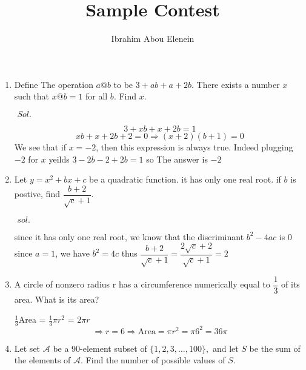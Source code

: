 \documentclass[a4paper]{article}
\theoremstyle{definition}
\begin{document}
\author{Ibrahim Abou Elenein}
\title{\textbf{Sample Contest}}
\maketitle
\noindent
\begin{enumerate}


\item Define The operation $a@b$ to be $3 + ab + a + 2b$. There exists a number
$x$ such that $x@b =1$ for all $b$. Find $x$.
\begin{tcolorbox}[width=\linewidth, sharp corners=all, colback=white!95!black]

$\textit{ Sol. }$

\[
    3 + xb + x + 2b = 1
\]
\[
    xb + x + 2b + 2 = 0 \Rightarrow (x+2)(b+1) = 0
\]
We see that if $x=-2$, then this expression is always true. Indeed
plugging $-2$ for $x$ yeilds $3-2b-2+2b=1$ so The answer is $-2$

\end{tcolorbox}

\item Let $y = x^2 + bx +c$ be a quadratic function. it has only one real root. if $b$
is postive, find $\dfrac{b+2}{\sqrt{c} + 1}$.

\begin{tcolorbox}[width=\linewidth, sharp corners=all, colback=white!95!black]

$\textit{ sol. }$

since it has only one real root, we know that the discriminant $b^2-4ac$ is $0$
since $a=1$, we have $b^2 = 4c$ thus $\dfrac{b+2}{\sqrt{c} + 1} = \dfrac{2\sqrt{c} + 2}{\sqrt{c} + 1} = 2$
\end{tcolorbox}


\item A circle of nonzero radius r has a circumference numerically equal to
$\dfrac{1}{3}$ of its area. What is its area?

\begin{tcolorbox}[width=\linewidth, sharp corners=all, colback=white!95!black]
    $  \frac{1}{3} $Area =  $\frac{1}{3} \pi r^2$ = $2\pi r$
    \[
       \Rightarrow r = 6 \Rightarrow \text{Area} = \pi r^2 = \pi 6^2 = 36\pi
    \]
\end{tcolorbox}

\item Let set $\mathcal{A}$ be a 90-element subset of $\{1,2,3,\ldots,100\},$ and let $S$ be the sum of the elements of $\mathcal{A}.$ Find the number of possible values of $S.$


\end{enumerate}
\end{document}
